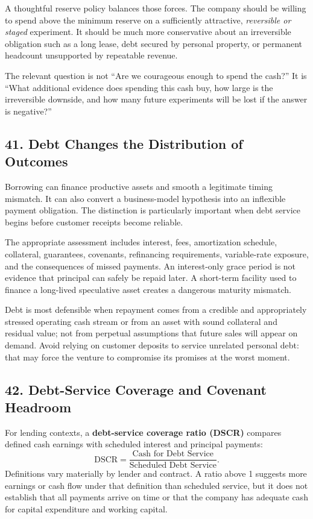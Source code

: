 A thoughtful reserve policy balances those forces. The company should be willing to spend above the minimum reserve on a sufficiently attractive, \emph{reversible or staged} experiment. It should be much more conservative about an irreversible obligation such as a long lease, debt secured by personal property, or permanent headcount unsupported by repeatable revenue.

The relevant question is not ``Are we courageous enough to spend the cash?'' It is ``What additional evidence does spending this cash buy, how large is the irreversible downside, and how many future experiments will be lost if the answer is negative?''

\subsection*{41. Debt Changes the Distribution of Outcomes}

Borrowing can finance productive assets and smooth a legitimate timing mismatch. It can also convert a business-model hypothesis into an inflexible payment obligation. The distinction is particularly important when debt service begins before customer receipts become reliable.

The appropriate assessment includes interest, fees, amortization schedule, collateral, guarantees, covenants, refinancing requirements, variable-rate exposure, and the consequences of missed payments. An interest-only grace period is not evidence that principal can safely be repaid later. A short-term facility used to finance a long-lived speculative asset creates a dangerous maturity mismatch.

Debt is most defensible when repayment comes from a credible and appropriately stressed operating cash stream or from an asset with sound collateral and residual value; not from perpetual assumptions that future sales will appear on demand. Avoid relying on customer deposits to service unrelated personal debt: that may force the venture to compromise its promises at the worst moment.

\subsection*{42. Debt-Service Coverage and Covenant Headroom}

For lending contexts, a \textbf{debt-service coverage ratio (DSCR)} compares defined cash earnings with scheduled interest and principal payments:
\begin{equation}
\text{DSCR} = \frac{\text{Cash for Debt Service}}{\text{Scheduled Debt Service}}.
\end{equation}
Definitions vary materially by lender and contract. A ratio above 1 suggests more earnings or cash flow under that definition than scheduled service, but it does not establish that all payments arrive on time or that the company has adequate cash for capital expenditure and working capital.

